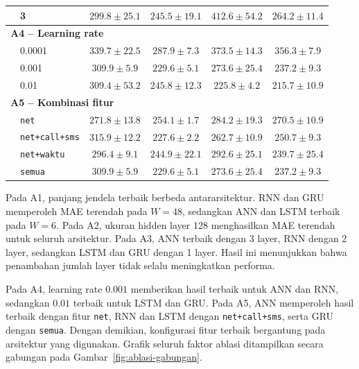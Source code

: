 \documentclass[conference,a4paper]{IEEEtran}
\begin{document}
\begin{table}[ht]
\begin{tabular}{@{}llcccc@{}}
& 3 & $\mathbf{299.8 \pm 25.1}$ & $245.5 \pm 19.1$ & $412.6 \pm 54.2$ & $264.2 \pm 11.4$\\
\midrule
\multicolumn{6}{l}{\textbf{A4 -- Learning rate}}\\
& 0.0001 & $339.7 \pm 22.5$ & $287.9 \pm 7.3$ & $373.5 \pm 14.3$ & $356.3 \pm 7.9$\\
& 0.001 & $\mathbf{309.9 \pm 5.9}$ & $\mathbf{229.6 \pm 5.1}$ & $273.6 \pm 25.4$ & $237.2 \pm 9.3$\\
& 0.01 & $309.4 \pm 53.2$ & $245.8 \pm 12.3$ & $\mathbf{225.8 \pm 4.2}$ & $\mathbf{215.7 \pm 10.9}$\\
\midrule
\multicolumn{6}{l}{\textbf{A5 -- Kombinasi fitur}}\\
& \texttt{net} & $\mathbf{271.8 \pm 13.8}$ & $254.1 \pm 1.7$ & $284.2 \pm 19.3$ & $270.5 \pm 10.9$\\
& \texttt{net+call+sms} & $315.9 \pm 12.2$ & $\mathbf{227.6 \pm 2.2}$ & $\mathbf{262.7 \pm 10.9}$ & $250.7 \pm 9.3$\\
& \texttt{net+waktu} & $296.4 \pm 9.1$ & $244.9 \pm 22.1$ & $292.6 \pm 25.1$ & $239.7 \pm 25.4$\\
& \texttt{semua} & $309.9 \pm 5.9$ & $229.6 \pm 5.1$ & $273.6 \pm 25.4$ & $\mathbf{237.2 \pm 9.3}$\\
\bottomrule
\end{tabular}
\end{table}

Pada A1, panjang jendela terbaik berbeda antararsitektur. RNN dan GRU memperoleh MAE terendah pada $W=48$, sedangkan ANN dan LSTM terbaik pada $W=6$. Pada A2, ukuran hidden layer 128 menghasilkan MAE terendah untuk seluruh arsitektur. Pada A3, ANN terbaik dengan 3 layer, RNN dengan 2 layer, sedangkan LSTM dan GRU dengan 1 layer. Hasil ini menunjukkan bahwa penambahan jumlah layer tidak selalu meningkatkan performa.

Pada A4, learning rate $0.001$ memberikan hasil terbaik untuk ANN dan RNN, sedangkan $0.01$ terbaik untuk LSTM dan GRU. Pada A5, ANN memperoleh hasil terbaik dengan fitur \texttt{net}, RNN dan LSTM dengan \texttt{net+call+sms}, serta GRU dengan \texttt{semua}. Dengan demikian, konfigurasi fitur terbaik bergantung pada arsitektur yang digunakan. Grafik seluruh faktor ablasi ditampilkan secara gabungan pada Gambar~\ref{fig:ablasi-gabungan}.
\end{document}

